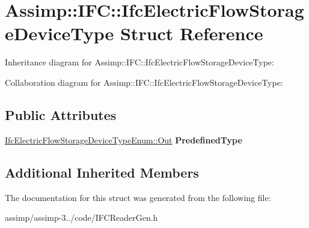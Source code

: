 \hypertarget{struct_assimp_1_1_i_f_c_1_1_ifc_electric_flow_storage_device_type}{\section{Assimp\+:\+:I\+F\+C\+:\+:Ifc\+Electric\+Flow\+Storage\+Device\+Type Struct Reference}
\label{struct_assimp_1_1_i_f_c_1_1_ifc_electric_flow_storage_device_type}
}


Inheritance diagram for Assimp\+:\+:I\+F\+C\+:\+:Ifc\+Electric\+Flow\+Storage\+Device\+Type\+:


Collaboration diagram for Assimp\+:\+:I\+F\+C\+:\+:Ifc\+Electric\+Flow\+Storage\+Device\+Type\+:
\subsection*{Public Attributes}
\begin{DoxyCompactItemize}
\item 
\hypertarget{struct_assimp_1_1_i_f_c_1_1_ifc_electric_flow_storage_device_type_a57136120c88f6fb31487ca7fd8a3d3be}{\hyperlink{classboost_1_1shared__ptr}{Ifc\+Electric\+Flow\+Storage\+Device\+Type\+Enum\+::\+Out} {\bfseries Predefined\+Type}}\label{struct_assimp_1_1_i_f_c_1_1_ifc_electric_flow_storage_device_type_a57136120c88f6fb31487ca7fd8a3d3be}

\end{DoxyCompactItemize}
\subsection*{Additional Inherited Members}


The documentation for this struct was generated from the following file\+:\begin{DoxyCompactItemize}
\item 
assimp/assimp-\/3../code/I\+F\+C\+Reader\+Gen.\+h\end{DoxyCompactItemize}
